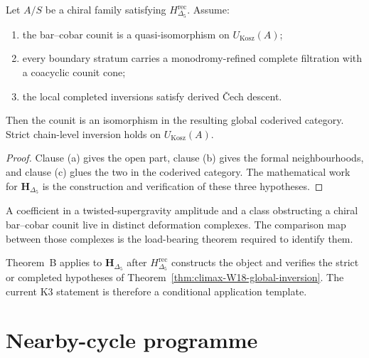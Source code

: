 \begin{theorem}
\label{thm:climax-W18-global-inversion}
\ClaimStatusConditional
Let \(A/S\) be a chiral family satisfying
\(H_{\Delta_5}^{\mathrm{rec}}\).  Assume:
\begin{enumerate}[label=\textup{(\alph*)}]
\item the bar--cobar counit is a quasi-isomorphism on
\(U_{\mathrm{Kosz}}(A)\);
\item every boundary stratum carries a monodromy-refined complete
filtration with a coacyclic counit cone;
\item the local completed inversions satisfy derived Čech descent.
\end{enumerate}
Then the counit is an isomorphism in the resulting global coderived
category.  Strict chain-level inversion holds on
\(U_{\mathrm{Kosz}}(A)\).
\end{theorem}

\begin{proof}
Clause (a) gives the open part, clause (b) gives the formal
neighbourhoods, and clause (c) glues the two in the coderived category.
The mathematical work for \(\mathbf H_{\Delta_5}\) is the
construction and verification of these three hypotheses.
\end{proof}

\begin{remark}
\label{rem:cclimax-W17-costello-link}
A coefficient in a twisted-supergravity amplitude and a class
obstructing a chiral bar--cobar counit live in distinct deformation
complexes.  The comparison map between those complexes is the
load-bearing theorem required to identify them.
\end{remark}

\begin{remark}
\label{rem:cclimax-theoremB-scope-update}
Theorem~B applies to \(\mathbf H_{\Delta_5}\) after
\(H_{\Delta_5}^{\mathrm{rec}}\) constructs the object and verifies the
strict or completed hypotheses of
Theorem~\ref{thm:climax-W18-global-inversion}.  The current K3
statement is therefore a conditional application template.
\end{remark}

\section{Nearby-cycle programme}
\label{sec:cclimax-chain-level-nearby-cycle-global-inversion}
\label{subsec:cclimax-global-inversion-climax-form}

